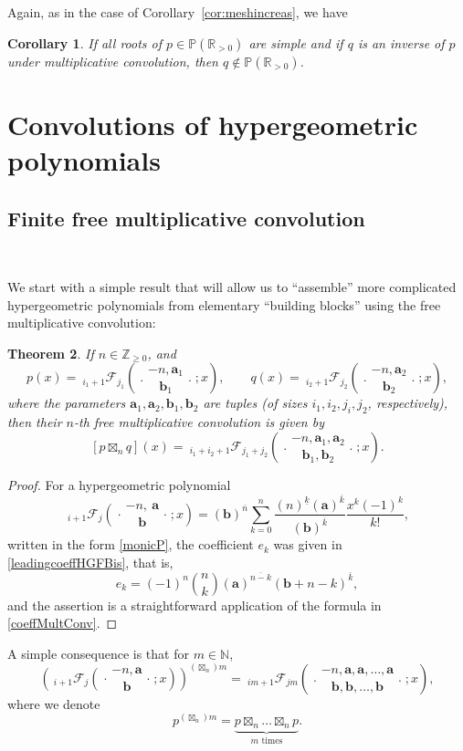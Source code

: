 \documentclass[reqno,11pt]{amsart}
\newtheorem{theorem}{Theorem}[section]
\newtheorem{corollary}[theorem]{Corollary}
\theoremstyle{remark}
\renewcommand{\P}{\mathbb{P}}
\newcommand{\R}{\mathbb{R}}
\newcommand{\nn}{\mathbb{N}}
\newcommand{\rr}{\mathbb{R}}
\newcommand{\raising}[2]{\left(#1\right)^{\overline{#2}}}
\newcommand{\falling}[2]{\left(#1\right)^{\underline{#2}}}
\newcommand*\pFq[5]{%
 {\ }_{#1}{\mathcal F}_{#2}{\left(\genfrac..{0pt}{}{#3}{#4};#5\right)}%
}
\begin{document}
Again, as in the case of Corollary~\ref{cor:meshincreas}, we have  
\begin{corollary} \label{cor:Lmeshincreas}
If all roots of $p\in \P(\R_{> 0})$ are simple and if $q$ is an inverse of $p$ under multiplicative convolution, then $q\notin \P(\rr_{>0})$. 
\end{corollary}


\section{ Convolutions of hypergeometric polynomials} \label{sec:convolutionHGP}

\subsection{Finite free multiplicative convolution}\

We start with a simple result that will allow us to ``assemble'' more complicated hypergeometric polynomials from elementary ``building blocks'' using the free multiplicative convolution:
\begin{theorem} \label{thm:multiplicativeConvHG}
If $n\in \mathbb Z_{\ge 0}$, and  
$$p(x)=\pFq{i_1+1}{j_1}{-n, \bm a_1}{\bm b_1}{x}, \qquad q(x)=\pFq{i_2+1}{j_2}{-n, \bm a_2}{\bm b_2}{x},$$
where the parameters $\bm a_1,\bm a_2,\bm b_1,\bm b_2 $ are tuples (of sizes $i_1,i_2,j_i,j_2$, respectively), then their $n$-th free multiplicative convolution is given by
$$[p\boxtimes_n q](x)=\pFq{i_1+i_2+1}{j_1+j_2}{-n, \bm a_1, \bm a_2}{\bm b_1,\bm b_2}{x}.$$
\end{theorem}
\begin{proof}
For a hypergeometric polynomial
$$
\pFq{i+1}{j}{-n,\ \bm{a}}{\bm b}{x}= \raising{\bm b}{n}\sum_{k=0}^n \frac{\falling{n}{k} \raising{\bm a}{k}}{\raising{\bm b}{k}} \frac{x^k(-1)^k}{k !},
$$
written in the form \eqref{monicP}, the coefficient $e_k$ was given in \eqref{leadingcoeffHGFBis}, that is,
\begin{equation}
    \label{expressionCOeffHGP}
e_k= (-1)^{n }   \binom{n}{k}
    \raising{\bm a}{n-k} \raising{\bm b+n-k}{k},   
\end{equation}  
and the assertion is a straightforward application of the formula in \eqref{coeffMultConv}.
\end{proof} 
A simple consequence is that for $m\in \nn$,
$$
\left( \pFq{i+1}{j}{-n, \bm a}{\bm b}{x}\right) ^{\left( \boxtimes_n\right) m} = \pFq{im+1}{jm}{-n, \bm a,\bm a, \dots, \bm a}{\bm b,\bm b, \dots, \bm b}{x},
$$
where we denote
$$
p ^{ \left( \boxtimes_n\right) m } = \underbrace{p \boxtimes_n \dots \boxtimes_n p}_{m \text{ times}}.
$$
\end{document}
